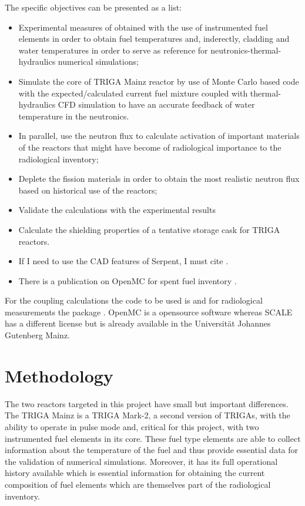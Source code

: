 \documentclass[11pt]{article} %
\begin{document}
The specific objectives can be presented as a list:
\begin{itemize}
  \item  Experimental measures of obtained with the use of instrumented fuel elements in order to obtain fuel temperatures and, inderectly, cladding and water temperatures in order to serve as reference for neutronics-thermal-hydraulics numerical simulations;
  \item Simulate the core of TRIGA Mainz reactor by use of Monte Carlo based code with the expected/calculated current fuel mixture coupled with thermal-hydraulics CFD simulation to have an accurate feedback of water temperature in the neutronics. 
  \item In parallel, use the neutron flux to calculate activation of important materials of the reactors that might have become of radiological importance to the radiological inventory;
  \item Deplete the fission materials in order to obtain the most realistic neutron flux based on historical use of the reactors;
  \item Validate the calculations with the experimental results
  \item Calculate the shielding properties of a tentative storage cask for TRIGA reactors.
  \item If I need to use the CAD features of Serpent, I must cite \cite{Leppanen_2022}.
  \item There is a publication on OpenMC for spent fuel inventory \cite{Pineda_2025}.
\end{itemize}

For the coupling calculations the code to be used is \cite{OpenMC_2015} and for radiological measurements the package \cite{SCALE_632}. OpenMC is a opensource software whereas SCALE has a different license but is already available in the Universität Johannes Gutenberg Mainz.


\section{Methodology}

The two reactors targeted in this project have small but important differences. The TRIGA Mainz is a TRIGA Mark-2, a second version of TRIGAs, with the ability to operate in pulse mode and, critical for this project, with two instrumented fuel elements in its core. These fuel type elements are able to collect information about the temperature of the fuel and thus provide essential data for the validation of numerical simulations. Moreover, it has its full operational history available which is essential information for obtaining the current composition of fuel elements which are themselves part of the radiological inventory.
\end{document}
